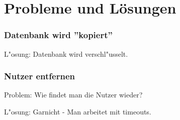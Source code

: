 \section{Probleme und Lösungen}


\begin{frame}
	\frametitle{Datenbank wird ''kopiert''}
	L"osung: Datenbank wird verschl"usselt.
\end{frame}

\begin{frame}
	\frametitle{Nutzer entfernen}
	Problem: Wie findet man die Nutzer wieder?
	\par
	L"osung: Garnicht - Man arbeitet mit timeouts.
\end{frame}
